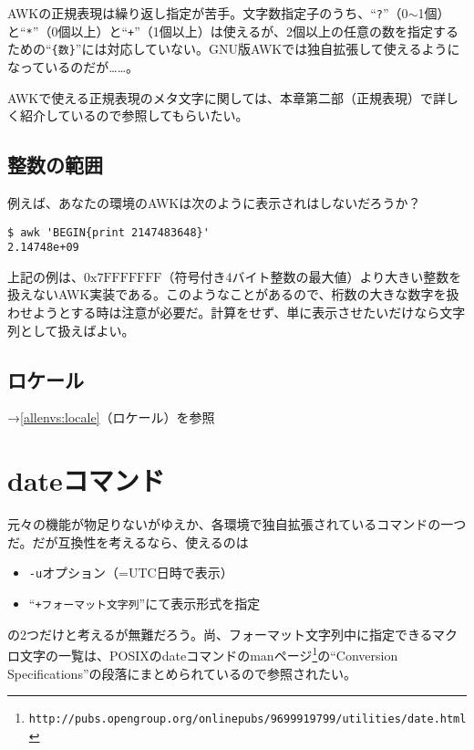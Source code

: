 AWKの正規表現は繰り返し指定が苦手。文字数指定子のうち、``\verb|?|''（0$\sim$1個）と``\verb|*|''（0個以上）と``\verb|+|''（1個以上）は使えるが、2個以上の任意の数を指定するための``\verb|{数}|''には対応していない。GNU版AWKでは独自拡張して使えるようになっているのだが……。

AWKで使える正規表現のメタ文字に関しては、本章第二部（正規表現）で詳しく紹介しているので参照してもらいたい。

\subsection*{整数の範囲}

例えば、あなたの環境のAWKは次のように表示されはしないだろうか？

\begin{screen}
	\verb|$ awk 'BEGIN{print 2147483648}'| \return \\
	\verb|2.14748e+09| 
\end{screen}

上記の例は、$\mathrm{0x7FFFFFFF}$（符号付き4バイト整数の最大値）より大きい整数を扱えないAWK実装である。このようなことがあるので、桁数の大きな数字を扱わせようとする時は注意が必要だ。計算をせず、単に表示させたいだけなら文字列として扱えばよい。

\subsection*{ロケール}

\noindent
→\ref{allenvs:locale}（ロケール）を参照

\section{dateコマンド}

元々の機能が物足りないがゆえか、各環境で独自拡張されているコマンドの一つだ。だが互換性を考えるなら、使えるのは

\begin{itemize}
  \item \verb|-u|オプション（=UTC日時で表示）
  \item ``\verb|+フォーマット文字列|''にて表示形式を指定
\end{itemize}
の2つだけと考えるが無難だろう。尚、フォーマット文字列中に指定できるマクロ文字の一覧は、POSIXのdateコマンドのmanページ\footnote{\verb|http://pubs.opengroup.org/onlinepubs/9699919799/utilities/date.html|}の``Conversion Specifications''の段落にまとめられているので参照されたい。

